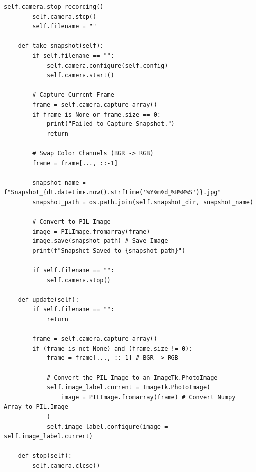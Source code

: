 \documentclass{article}
\begin{document}
\begin{lstlisting}[caption={Source Code : PiCamera Display}, label={lst:picamera_display_code}]
        self.camera.stop_recording()
        self.camera.stop()
        self.filename = ""

    def take_snapshot(self):
        if self.filename == "":
            self.camera.configure(self.config)
            self.camera.start()

        # Capture Current Frame
        frame = self.camera.capture_array()
        if frame is None or frame.size == 0:
            print("Failed to Capture Snapshot.")
            return

        # Swap Color Channels (BGR -> RGB)
        frame = frame[..., ::-1]

        snapshot_name = f"Snapshot_{dt.datetime.now().strftime('%Y%m%d_%H%M%S')}.jpg"
        snapshot_path = os.path.join(self.snapshot_dir, snapshot_name)

        # Convert to PIL Image
        image = PILImage.fromarray(frame)
        image.save(snapshot_path) # Save Image
        print(f"Snapshot Saved to {snapshot_path}")

        if self.filename == "":
            self.camera.stop()

    def update(self):
        if self.filename == "":
            return

        frame = self.camera.capture_array()
        if (frame is not None) and (frame.size != 0):
            frame = frame[..., ::-1] # BGR -> RGB

            # Convert the PIL Image to an ImageTk.PhotoImage
            self.image_label.current = ImageTk.PhotoImage(
                image = PILImage.fromarray(frame) # Convert Numpy Array to PIL.Image
            )
            self.image_label.configure(image = self.image_label.current)

    def stop(self):
        self.camera.close()
\end{lstlisting}
\end{document}
